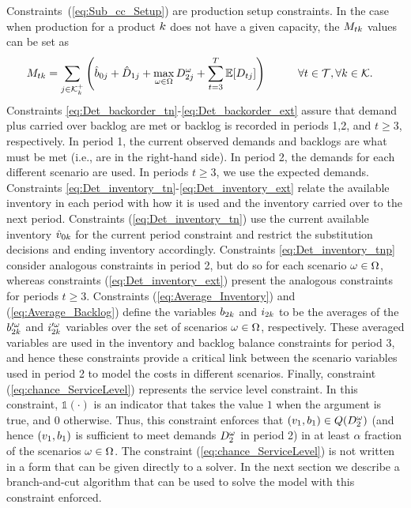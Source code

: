 \documentclass[msom]{oo}
\begin{document}
Constraints~(\ref{eq:Sub_cc_Setup}) are production setup constraints. In the case when production for a product $k$ does not have a given capacity, the $M_{t k}$ values can be set as
\begin{alignat*}{2}
  &  M_{t k} =  \sum_{j \in  \mathcal{K}^+_k}\left( \hat{b}_{0 j}+  {\hat{D}}_{1 j} + \max_{\omega \in \Omega} {D}^{\omega}_{2 j}+ \sum_{t =3}^T \mathbb{E}[{D}_{t j}]\right)  &&\qquad \forall t \in \mathcal{T} ,\forall k \in \mathcal{K} .   
  \end{alignat*}
Constraints 
\eqref{eq:Det_backorder_tn}-\eqref{eq:Det_backorder_ext}
assure that demand plus carried over backlog are met or backlog is recorded in periods 1,2, and $t\geq3$, respectively. In period 1, the current observed demands and backlogs are what must be met (i.e., are in the right-hand side). In period 2, the demands for each different scenario are used. In periods $t\geq 3$, we use the expected demands.
Constraints \eqref{eq:Det_inventory_tn}-\eqref{eq:Det_inventory_ext} relate the available inventory in each period with how it is used and the inventory carried over to the next period.
Constraints (\ref{eq:Det_inventory_tn}) use the current available inventory $\hat{v}_{0k}$ for the current period constraint and restrict the substitution decisions and ending inventory accordingly. Constraints \eqref{eq:Det_inventory_tnp} consider analogous constraints in period 2, but do so for each scenario $\omega \in \Omega$, whereas constraints (\ref{eq:Det_inventory_ext}) present the analogous constraints for periods $t \geq 3$.
Constraints (\ref{eq:Average_Inventory}) and (\ref{eq:Average_Backlog}) define the variables $b_{2k}$ and $i_{2 k}$ to be the averages of the $b'^{\omega}_{2 k}$ and $i'^{\omega}_{2 k}$ variables over the set of scenarios $\omega \in \Omega$, respectively. These averaged variables are used in the inventory and backlog balance constraints for period $3$, and hence these constraints provide a critical link between the scenario variables used in period 2 to model the costs in different scenarios.
Finally, constraint (\ref{eq:chance_ServiceLevel}) represents the service level constraint. In this constraint, $\mathds{1}(\cdot)$ is an indicator that takes the value $1$ when the argument is true, and 0 otherwise. Thus, this constraint enforces that  $(v_1,b_1) \in Q(D_{2}^\omega)$ (and hence $(v_1,b_1)$ is sufficient to meet demands $D_{2}^{\omega}$ in period 2) in at least $\alpha$ fraction of the scenarios $\omega \in \Omega$. 
The constraint (\ref{eq:chance_ServiceLevel})
is not written in a form that can be given directly to a solver. In the next section we describe a branch-and-cut algorithm that can be used to solve the model with this constraint enforced.
    
\end{document}
